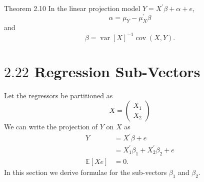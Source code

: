 \documentclass[10pt]{article}
\begin{document}
Theorem 2.10 In the linear projection model $Y=X^{\prime} \beta+\alpha+e$,
$$
\alpha=\mu_{Y}-\mu_{X}^{\prime} \beta
$$
and
$$
\beta=\operatorname{var}[X]^{-1} \operatorname{cov}(X, Y) .
$$

\section{$2.22$ Regression Sub-Vectors}
Let the regressors be partitioned as
$$
X=\left(\begin{array}{l}
X_{1} \\
X_{2}
\end{array}\right)
$$
We can write the projection of $Y$ on $X$ as
$$
\begin{aligned}
Y &=X^{\prime} \beta+e \\
&=X_{1}^{\prime} \beta_{1}+X_{2}^{\prime} \beta_{2}+e \\
\mathbb{E}[X e] &=0 .
\end{aligned}
$$
In this section we derive formulae for the sub-vectors $\beta_{1}$ and $\beta_{2}$.
\end{document}
